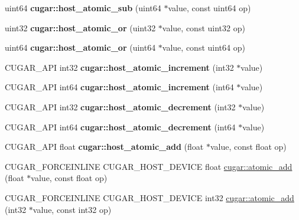 \begin{DoxyCompactItemize}
\item 
\mbox{\label{group___atomics_gae94467e77459e81a35ce7cd321ec6391}} 
uint64 {\bfseries cugar\+::host\+\_\+atomic\+\_\+sub} (uint64 $\ast$value, const uint64 op)
\item 
\mbox{\label{group___atomics_gad9fe547d45b656783dcdc488b5ae093f}} 
uint32 {\bfseries cugar\+::host\+\_\+atomic\+\_\+or} (uint32 $\ast$value, const uint32 op)
\item 
\mbox{\label{group___atomics_ga843271e1ff5ac28c518eddd9b049f561}} 
uint64 {\bfseries cugar\+::host\+\_\+atomic\+\_\+or} (uint64 $\ast$value, const uint64 op)
\item 
\mbox{\label{group___atomics_gaff8bbdb2d54e2738c145df2148dccde2}} 
C\+U\+G\+A\+R\+\_\+\+A\+PI int32 {\bfseries cugar\+::host\+\_\+atomic\+\_\+increment} (int32 $\ast$value)
\item 
\mbox{\label{group___atomics_ga3bf66fab480b9b53f0f9cca8826c3ac1}} 
C\+U\+G\+A\+R\+\_\+\+A\+PI int64 {\bfseries cugar\+::host\+\_\+atomic\+\_\+increment} (int64 $\ast$value)
\item 
\mbox{\label{group___atomics_gac448b74098759d1a056ec99006bd9bc2}} 
C\+U\+G\+A\+R\+\_\+\+A\+PI int32 {\bfseries cugar\+::host\+\_\+atomic\+\_\+decrement} (int32 $\ast$value)
\item 
\mbox{\label{group___atomics_ga04f1ec7d04e18e82bc892005902b86c4}} 
C\+U\+G\+A\+R\+\_\+\+A\+PI int64 {\bfseries cugar\+::host\+\_\+atomic\+\_\+decrement} (int64 $\ast$value)
\item 
\mbox{\label{group___atomics_ga2699c8fe4ad73c9e804a0a0028dd8a99}} 
C\+U\+G\+A\+R\+\_\+\+A\+PI float {\bfseries cugar\+::host\+\_\+atomic\+\_\+add} (float $\ast$value, const float op)
\item 
C\+U\+G\+A\+R\+\_\+\+F\+O\+R\+C\+E\+I\+N\+L\+I\+NE C\+U\+G\+A\+R\+\_\+\+H\+O\+S\+T\+\_\+\+D\+E\+V\+I\+CE float \hyperlink{group___atomics_ga0c9d949be7ac5b6f27a232c7cd27a05c}{cugar\+::atomic\+\_\+add} (float $\ast$value, const float op)
\item 
C\+U\+G\+A\+R\+\_\+\+F\+O\+R\+C\+E\+I\+N\+L\+I\+NE C\+U\+G\+A\+R\+\_\+\+H\+O\+S\+T\+\_\+\+D\+E\+V\+I\+CE int32 \hyperlink{group___atomics_ga584797bd163a76c90bf0fb5c7df58de4}{cugar\+::atomic\+\_\+add} (int32 $\ast$value, const int32 op)

\end{DoxyCompactItemize}
